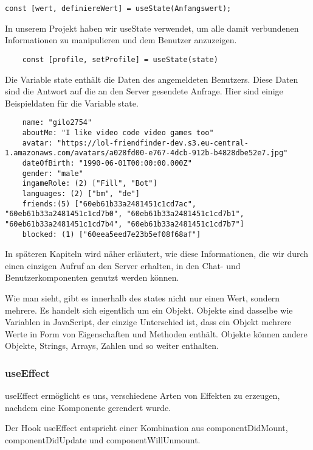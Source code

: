 \begin{lstlisting}
const [wert, definiereWert] = useState(Anfangswert);
\end{lstlisting}

In unserem Projekt haben wir useState verwendet, um alle damit verbundenen Informationen zu manipulieren und dem Benutzer anzuzeigen.
\begin{lstlisting}
    const [profile, setProfile] = useState(state)    
    \end{lstlisting}

Die Variable state enthält die Daten des angemeldeten Benutzers. Diese Daten sind die Antwort auf die an den Server gesendete Anfrage. 
Hier sind einige Beispieldaten für die Variable state.

\begin{lstlisting}
    name: "gilo2754"
    aboutMe: "I like video code video games too"
    avatar: "https://lol-friendfinder-dev.s3.eu-central-1.amazonaws.com/avatars/a028fd00-e767-4dcb-912b-b4828dbe52e7.jpg"
    dateOfBirth: "1990-06-01T00:00:00.000Z"
    gender: "male"
    ingameRole: (2) ["Fill", "Bot"]
    languages: (2) ["bm", "de"]
    friends:(5) ["60eb61b33a2481451c1cd7ac", "60eb61b33a2481451c1cd7b0", "60eb61b33a2481451c1cd7b1", "60eb61b33a2481451c1cd7b4", "60eb61b33a2481451c1cd7b7"]
    blocked: (1) ["60eea5eed7e23b5ef08f68af"]
\end{lstlisting}
In späteren Kapiteln wird näher erläutert, wie diese Informationen, die wir durch einen einzigen Aufruf an den Server erhalten, in den Chat- und Benutzerkomponenten genutzt werden können. 

Wie man sieht, gibt es innerhalb des states nicht nur einen Wert, sondern mehrere.
Es handelt sich eigentlich um ein Objekt. Objekte sind dasselbe wie Variablen in JavaScript, der einzige Unterschied ist, dass ein Objekt mehrere Werte in Form von Eigenschaften und Methoden enthält.
Objekte können andere Objekte, Strings, Arrays, Zahlen und so weiter enthalten.
\newpage

\subsubsection{useEffect}
useEffect ermöglicht es uns, verschiedene Arten von Effekten zu erzeugen, nachdem eine Komponente gerendert wurde. 

Der Hook useEffect entspricht einer Kombination aus componentDidMount, componentDidUpdate und componentWillUnmount.

